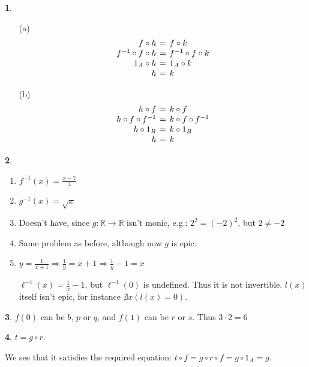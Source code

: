 \documentclass{article}
\theoremstyle{definition}
\newcommand{\bb}[1]{\mathbb{#1}}
\newcommand{\R}{\bb{R}}
\theoremstyle{definition}
\theoremstyle{definition}
\newtheorem{solution-internal}{}[subsection]
\newenvironment{solution}{
  \begin{solution-internal}
}{
  \end{solution-internal}
}
\begin{document}
\begin{solution}
$ $%
\begin{itemize}
\item[(a)]
\[
\arraycolsep=2pt
\begin{array}{rcl}
  f \circ h              & = & f \circ k \\
  f^{-1} \circ f \circ h & = & f^{-1} \circ f \circ k \\
  1_A \circ h            & = & 1_A \circ k \\
  h                      & = & k
\end{array}
\]
\item[(b)]
\[
\arraycolsep=2pt
\begin{array}{rcl}
  h \circ f              & = & k \circ f \\
  h \circ f \circ f^{-1} & = & k \circ f \circ f^{-1} \\
  h \circ 1_B            & = & k \circ 1_B \\
  h                      & = & k
\end{array}
\]
\end{itemize}

\end{solution}
\begin{solution}
$ $
\begin{enumerate} 
\item $f^{-1}(x) = \frac{x-7}{3}$
\item $g^{-1}(x) = \sqrt{x}$
\item Doesn't have, since $g\colon \R \to \R$ isn't monic, e.g.: $2^2 = {(-2)}^2$, but $2 \neq -2$
\item Same problem as before, although now $g$ is epic.
\item $y = \frac{1}{x+1} \Rightarrow \frac{1}{y} = x + 1 \Rightarrow \frac{1}{y} - 1 = x$

$\ell^{-1}(x) = \frac{1}{x} - 1$, but $\ell^{-1}(0)$ is undefined.
Thus it is not invertible. $l(x)$ itself isn't epic, for instance $\nexists x (l(x) = 0)$.
\end{enumerate} 
\end{solution}

\begin{solution}
$f(0)$ can be $b$, $p$ or $q$, and $f(1)$ can be $r$ or $s$. Thus $3 \cdot 2 = 6$
\end{solution}

\begin{solution}
$t = g \circ r$.

\begin{center}
\end{center}

We see that it satisfies the required equation: $t \circ f = g \circ r \circ f = g \circ 1_A = g$.
\end{solution}
\end{document}
